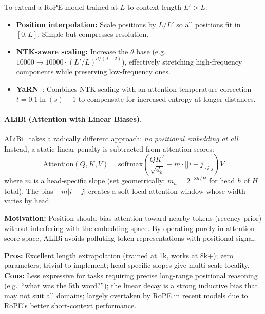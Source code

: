 \begin{intuitionbox}
To extend a RoPE model trained at $L$ to context length $L' > L$:

\begin{itemize}
  \item \textbf{Position interpolation:} Scale positions by $L/L'$ so all positions fit in $[0, L]$. Simple but compresses resolution.
  \item \textbf{NTK-aware scaling:} Increase the $\theta$ base (e.g.~$10000 \to 10000 \cdot (L'/L)^{d/(d-2)}$), effectively stretching high-frequency components while preserving low-frequency ones.
  \item \textbf{YaRN}~\cite{peng2023yarn}: Combines NTK scaling with an attention temperature correction $t = 0.1 \ln(s) + 1$ to compensate for increased entropy at longer distances.
\end{itemize}
\end{intuitionbox}

\paragraph{ALiBi (Attention with Linear Biases).}
\label{alibi-attention-with-linear-biases.}

ALiBi~\cite{press2022train} takes a radically different approach: \emph{no positional embedding at all}. Instead, a static linear penalty is subtracted from attention scores: 
\[
\text{Attention}(Q, K, V) = \text{softmax}\!\left(\frac{QK^T}{\sqrt{d_k}} - m \cdot \bigl[|i-j|\bigr]_{i,j}\right) V
\]
 where $m$ is a head-specific slope (set geometrically: $m_h = 2^{-8h/H}$ for head $h$ of $H$ total). The bias $-m|i-j|$ creates a soft local attention window whose width varies by head.

\textbf{Motivation:} Position should bias attention toward nearby tokens (recency prior) without interfering with the embedding space. By operating purely in attention-score space, ALiBi avoids polluting token representations with positional signal.

\textbf{Pros:} Excellent length extrapolation (trained at 1k, works at 8k+); zero parameters; trivial to implement; head-specific slopes give multi-scale locality.\\

\textbf{Cons:} Less expressive for tasks requiring precise long-range positional reasoning (e.g.~``what was the 5th word?''); the linear decay is a strong inductive bias that may not suit all domains; largely overtaken by RoPE in recent models due to RoPE’s better short-context performance.

